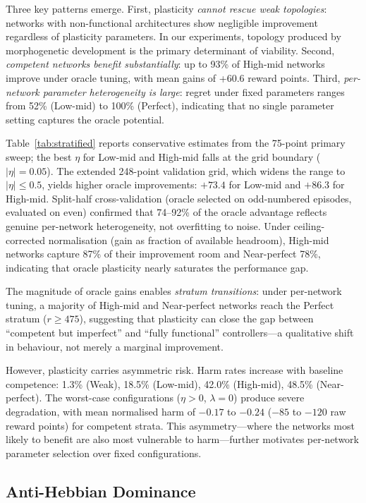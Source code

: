 \documentclass[sigconf,nonacm]{acmart}
\begin{document}
Three key patterns emerge. First, plasticity \emph{cannot rescue weak topologies}: networks with non-functional architectures show negligible improvement regardless of plasticity parameters. In our experiments, topology produced by morphogenetic development is the primary determinant of viability. Second, \emph{competent networks benefit substantially}: up to 93\% of High-mid networks improve under oracle tuning, with mean gains of +60.6 reward points. Third, \emph{per-network parameter heterogeneity is large}: regret under fixed parameters ranges from 52\% (Low-mid) to 100\% (Perfect), indicating that no single parameter setting captures the oracle potential.

Table~\ref{tab:stratified} reports conservative estimates from the 75-point primary sweep; the best $\eta$ for Low-mid and High-mid falls at the grid boundary ($|\eta| = 0.05$). The extended 248-point validation grid, which widens the range to $|\eta| \le 0.5$, yields higher oracle improvements: $+73.4$ for Low-mid and $+86.3$ for High-mid. Split-half cross-validation (oracle selected on odd-numbered episodes, evaluated on even) confirmed that 74--92\% of the oracle advantage reflects genuine per-network heterogeneity, not overfitting to noise. Under ceiling-corrected normalisation (gain as fraction of available headroom), High-mid networks capture 87\% of their improvement room and Near-perfect 78\%, indicating that oracle plasticity nearly saturates the performance gap.

The magnitude of oracle gains enables \emph{stratum transitions}: under per-network tuning, a majority of High-mid and Near-perfect networks reach the Perfect stratum ($r \ge 475$), suggesting that plasticity can close the gap between ``competent but imperfect'' and ``fully functional'' controllers---a qualitative shift in behaviour, not merely a marginal improvement.

However, plasticity carries asymmetric risk. Harm rates increase with baseline competence: 1.3\% (Weak), 18.5\% (Low-mid), 42.0\% (High-mid), 48.5\% (Near-perfect). The worst-case configurations ($\eta > 0$, $\lambda = 0$) produce severe degradation, with mean normalised harm of $-0.17$ to $-0.24$ ($-85$ to $-120$ raw reward points) for competent strata. This asymmetry---where the networks most likely to benefit are also most vulnerable to harm---further motivates per-network parameter selection over fixed configurations.

\subsection{Anti-Hebbian Dominance}
\end{document}
